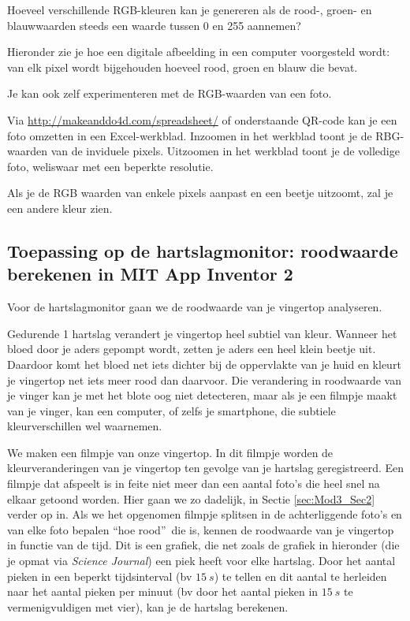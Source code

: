 \begin{oef}
	Hoeveel verschillende RGB-kleuren kan je genereren als de rood-, groen- en blauwwaarden steeds een waarde tussen 0 en 255 aannemen? 
\end{oef}

Hieronder zie je hoe een digitale afbeelding in een computer voorgesteld wordt: van elk pixel wordt bijgehouden hoeveel rood, groen en blauw die bevat. 


Je kan ook zelf experimenteren met de RGB-waarden van een foto. 

Via \url{http://makeanddo4d.com/spreadsheet/} of onderstaande QR-code kan je een foto omzetten in een Excel-werkblad. Inzoomen in het werkblad toont je de RBG-waarden van de inviduele pixels. Uitzoomen in het werkblad toont je de volledige foto, weliswaar met een beperkte resolutie.



Als je de RGB waarden van enkele pixels aanpast en een beetje uitzoomt, zal je een andere kleur zien.


\subsection{Toepassing op de hartslagmonitor: roodwaarde berekenen in MIT App Inventor 2}

Voor de hartslagmonitor gaan we de roodwaarde van je vingertop analyseren. 

Gedurende 1 hartslag verandert je vingertop heel subtiel van kleur. 
Wanneer het bloed door je aders gepompt wordt, zetten je aders een heel klein beetje uit. Daardoor komt het bloed net iets dichter bij de oppervlakte van je huid en kleurt je vingertop net iets meer rood dan daarvoor.
Die verandering in roodwaarde van je vinger kan je met het blote oog niet detecteren, maar als je een filmpje maakt van je vinger, kan een computer, of zelfs je smartphone, die subtiele kleurverschillen wel waarnemen.

We maken een filmpje van onze vingertop. In dit filmpje worden de kleurveranderingen van je vingertop ten gevolge van je hartslag geregistreerd. Een filmpje dat afspeelt is in feite niet meer dan een aantal foto's die heel snel na elkaar getoond worden. Hier gaan we zo dadelijk, in Sectie \ref{sec:Mod3_Sec2} verder op in. Als we het opgenomen filmpje splitsen in de achterliggende foto's en van elke foto bepalen \textquotedblleft hoe rood\textquotedblright \  die is, kennen de roodwaarde van je vingertop in functie van de tijd. Dit is een grafiek, die net zoals de grafiek in hieronder (die je opmat via \emph{Science Journal}) een piek heeft voor elke hartslag. Door het aantal pieken in een beperkt tijdsinterval (bv $15~s$) te tellen en dit aantal te herleiden naar het aantal pieken per minuut (bv door het aantal pieken in $15~s$ te vermenigvuldigen met vier), kan je de hartslag berekenen.

